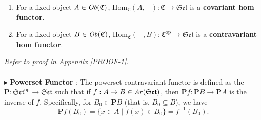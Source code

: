 \documentclass{article}
\theoremstyle{definition}
\theoremstyle{remark}
\theoremstyle{definition}
\theoremstyle{definition}
\theoremstyle{definition}
\newcommand{\inv}[1]{#1^{-1}}
\newcommand{\pset}{\mathbf{P}}
\newcommand{\cat}[1]{\mathfrak{#1}}
\newcommand{\opcat}[1]{\mathfrak{#1}^{\text{op}}}
\newcommand{\obj}[1]{\text{\textit{Ob}}(#1)}
\newcommand{\arr}[1]{\text{\textit{Ar}}(#1)}
\newcommand{\homset}[3]{\text{Hom}_{#1}(#2,#3)}
\newcommand{\point}[0]{$\blacktriangleright\;$}
\begin{document}
\begin{enumerate}
	\item {For a fixed object $ A \in \obj{\cat{C}}$, $ \homset{\cat{C}}{A}{-} : \cat{C} \longrightarrow \cat{Set}$ is a \textbf{covariant hom functor}.}
	\item {For a fixed object $ B\in\obj{\cat{C}}  $, $ \homset{\cat{C}}{-}{B} : \opcat{C}\longrightarrow \cat{Set}$ is a \textbf{contravariant hom functor}.}
\end{enumerate}
\emph{Refer to proof in Appendix \ref{PROOF-1}}.\\\\
\point \textbf{Powerset Functor} : The powerset contravariant functor is defined as the $ \pset : \opcat{Set} \longrightarrow \cat{Set} $ such that if $ f : A\to B\in \arr{\cat{Set}} $, then $ \pset f : \pset B \to \pset A $ is the inverse of $ f $. Specifically, for $ B_0 \in \pset B $ (that is, $ B_0 \subseteq B $), we have
\[\pset f(B_0) = \{x\in A \;\vert\; f(x) \in B_0\} = \inv{f}(B_0).\]
\end{document}
